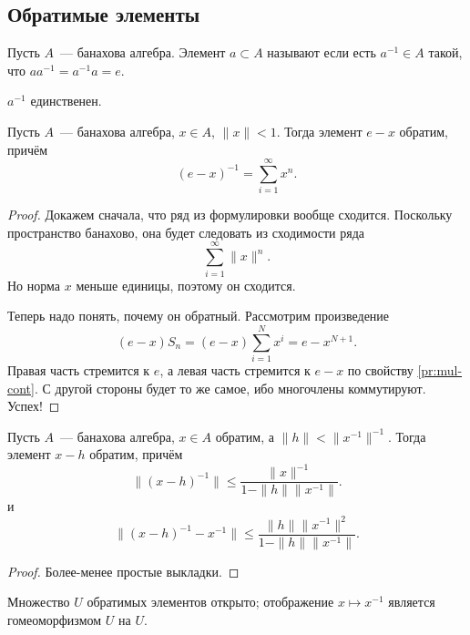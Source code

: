 \documentclass{notes}
\begin{document}
\subsection{Обратимые элементы}

	\begin{de}
		Пусть $A$~--- банахова алгебра. Элемент $a \subset A$ называют  если есть $a^{-1} \in A$ такой, что $a a^{-1} = a^{-1} a = e$.
	\end{de}

	\begin{st}
		$a^{-1}$ единственен.
	\end{st}

	\begin{thm}\label{thm:close-zero-inv}
		Пусть $A$~--- банахова алгебра, $x \in A$, $\|x\| < 1$. Тогда элемент $e - x$ обратим, причём
		\[
			(e - x)^{-1} = \sum\limits_{i = 1}^{\infty} x^n.
		\]
		\begin{proof}	
			Докажем сначала, что ряд из формулировки вообще сходится. Поскольку пространство банахово, она будет следовать из сходимости ряда
			\[
				\sum\limits_{i = 1}^{\infty} \|x\|^n.
			\]
			Но норма $x$ меньше единицы, поэтому он сходится.

			Теперь надо понять, почему он обратный. Рассмотрим произведение
			\[
				(e - x) S_n = (e - x)\sum\limits_{i = 1}^N x^i = e - x^{N+1}.
			\]
			Правая часть стремится к $e$, а левая часть стремится к $e - x$ по свойству \ref{pr:mul-cont}. С другой стороны будет то же самое, ибо многочлены коммутируют. Успех!
		\end{proof}
	\end{thm}

	\begin{thm} \label{thm:close-inv}
		Пусть $A$~--- банахова алгебра, $x \in A$ обратим, а $\|h\| < \|x^{-1}\|^{-1}$. Тогда элемент $x - h$ обратим, причём
		\[
			\big\|(x - h)^{-1}\big\|  \leqslant \dfrac{\|x\|^{-1}}{1 - \|h\| \|x^{-1}\|}. 
		\]
		и
		\[
			\big\|(x - h)^{-1} - x^{-1}\big\| \leqslant \dfrac{\|h\| \|x^{-1}\|^2}{1 - \|h\| \|x^{-1}\|}.
		\]
		\begin{proof}
			Более-менее простые выкладки.
		\end{proof}
	\end{thm}

	\begin{cor}
		Множество $U$ обратимых элементов открыто; отображение $x \mapsto x^{-1}$ является гомеоморфизмом $U$ на $U$.
	\end{cor}
\end{document}
